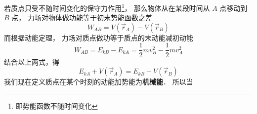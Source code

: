 

若质点只受不随时间变化的保守力作用\footnote{即势能函数不随时间变化}， 那么物体从在某段时间从 $A$ 点移动到 $B$ 点， 力场对物体做功能等于初末势能函数之差
\begin{equation}
W_{AB} = V(\vec r_A) - V(\vec r_B)
\end{equation}
而根据动能定理， 力场对质点做功等于质点的末动能减初动能
\begin{equation}
W_{AB} = E_{kB} - E_{kA} = \frac 12 m v_B^2 - \frac 12 m v_A^2
\end{equation}
结合以上两式，得
\begin{equation}
E_{kA} + V(\vec r_A) = E_{kB} + V(\vec r_B)
\end{equation}
我们现在定义质点在某个时刻的动能加势能为\textbf{机械能}． 所以当
